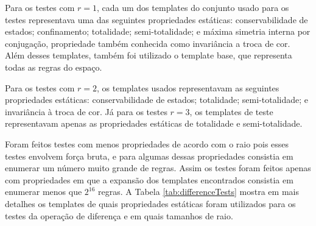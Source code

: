 Para os testes com $r = 1$, cada um dos templates do conjunto usado para os testes representava uma das seguintes propriedades estáticas: conservabilidade de estados; confinamento; totalidade; semi-totalidade; e máxima simetria interna por conjugação, propriedade também conhecida como invariância a troca de cor. Além desses templates, também foi utilizado o template base, que representa todas as regras do espaço.

Para os testes com $r = 2$, os templates usados representavam as seguintes propriedades estáticas: conservabilidade de estados; totalidade; semi-totalidade; e invariância à troca de cor. Já para os testes $r = 3$, os templates de teste representavam apenas as propriedades estáticas de totalidade e semi-totalidade. 

Foram feitos testes com menos propriedades de acordo com o raio pois esses testes envolvem força bruta, e para algumas dessas propriedades consistia em enumerar um número muito grande de regras. Assim os testes foram feitos apenas com propriedades em que a expansão dos templates encontrados consistia em enumerar menos que $2^{16}$ regras. A Tabela \ref{tab:differenceTests} mostra em mais detalhes os templates de quais propriedades estáticas foram utilizados para os testes da operação de diferença e em quais tamanhos de raio.

\begin{table}[h!]
\centering
\caption{Propriedades estáticas utilizadas para o teste da operação de diferença em cada raio}
\label{tab:differenceTests}
\end{table}

